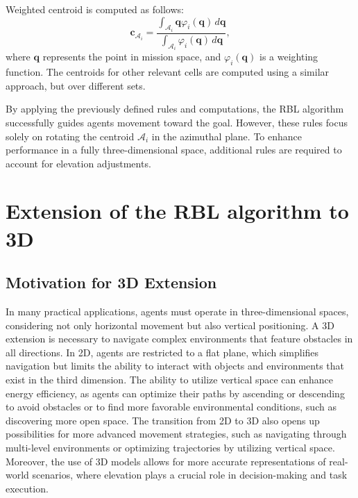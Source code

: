         Weighted centroid is computed as follows:        
        \begin{equation}
            \mathbf{c}_{\mathcal{A}_i} = \frac{\int_{\mathcal{A}_i} \mathbf{q} \varphi_i(\mathbf{q}) \, d\mathbf{q}}{\int_{\mathcal{A}_i} \varphi_i(\mathbf{q}) \, d\mathbf{q}},
        \end{equation}
        where \( \mathbf{q} \) represents the point in mission space, and \( \varphi_i(\mathbf{q}) \) is a weighting function. 
        The centroids for other relevant cells are computed using a similar approach, but over different sets.

        By applying the previously defined rules and computations, the RBL algorithm successfully guides agents movement toward the goal.
        However, these rules focus solely on rotating the centroid $\mathcal{A}_i$ in the azimuthal plane. 
        To enhance performance in a fully three-dimensional space, additional rules are required to account for elevation adjustments. 

\section{Extension of the RBL algorithm to 3D}
    \subsection{Motivation for 3D Extension}
        In many practical applications, agents must operate in three-dimensional spaces, considering not only horizontal movement but also vertical positioning.
        A 3D extension is necessary to navigate complex environments that feature obstacles in all directions.
        In 2D, agents are restricted to a flat plane, which simplifies navigation but limits the ability to interact with objects and environments that exist in the third dimension.
        The ability to utilize vertical space can enhance energy efficiency, as agents can optimize their paths by ascending or descending to avoid obstacles or to find more favorable environmental conditions, such as discovering more open space.
        The transition from 2D to 3D also opens up possibilities for more advanced movement strategies, such as navigating through multi-level environments or optimizing trajectories by utilizing vertical space.  
        Moreover, the use of 3D models allows for more accurate representations of real-world scenarios, where elevation plays a crucial role in decision-making and task execution.


